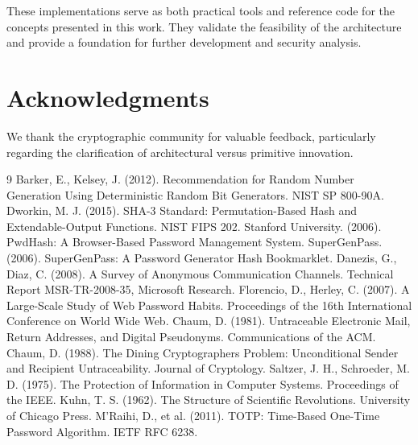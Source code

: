 \documentclass[11pt,a4paper]{article}
\begin{document}
These implementations serve as both practical tools and reference code for the concepts presented in this work. They validate the feasibility of the architecture and provide a foundation for further development and security analysis.

\section*{Acknowledgments}
We thank the cryptographic community for valuable feedback, particularly regarding the clarification of architectural versus primitive innovation.

\begin{thebibliography}{9}
 Barker, E., Kelsey, J. (2012). Recommendation for Random Number Generation Using Deterministic Random Bit Generators. NIST SP 800-90A.
 Dworkin, M. J. (2015). SHA-3 Standard: Permutation-Based Hash and Extendable-Output Functions. NIST FIPS 202.
 Stanford University. (2006). PwdHash: A Browser-Based Password Management System.
 SuperGenPass. (2006). SuperGenPass: A Password Generator Hash Bookmarklet.
 Danezis, G., Diaz, C. (2008). A Survey of Anonymous Communication Channels. Technical Report MSR-TR-2008-35, Microsoft Research.
 Florencio, D., Herley, C. (2007). A Large-Scale Study of Web Password Habits. Proceedings of the 16th International Conference on World Wide Web.
 Chaum, D. (1981). Untraceable Electronic Mail, Return Addresses, and Digital Pseudonyms. Communications of the ACM.
 Chaum, D. (1988). The Dining Cryptographers Problem: Unconditional Sender and Recipient Untraceability. Journal of Cryptology.
 Saltzer, J. H., Schroeder, M. D. (1975). The Protection of Information in Computer Systems. Proceedings of the IEEE.
 Kuhn, T. S. (1962). The Structure of Scientific Revolutions. University of Chicago Press.
 M'Raihi, D., et al. (2011). TOTP: Time-Based One-Time Password Algorithm. IETF RFC 6238.
\end{thebibliography}
\end{document}
